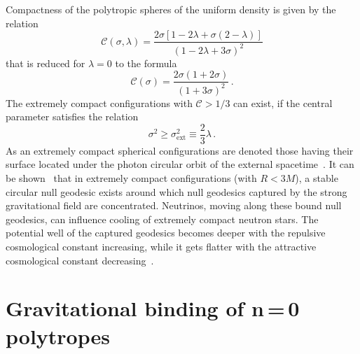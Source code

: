 Compactness of the polytropic spheres of the uniform density is given by the
relation
\begin{equation}
  \mathcal{C}(\sigma, \lambda)= \frac{2 \sigma [1- 2 \lambda + \sigma
    (2- \lambda)]}{(1- 2 \lambda + 3 \sigma)^{2}}         \label{Eq:grp-c1}
\end{equation}
that is reduced for $\lambda = 0$ to the formula
\begin{equation}
  \mathcal{C}(\sigma)
    = \frac{2 \sigma (1+ 2 \sigma)}{(1+ 3 \sigma)^{2}}\,. \label{Eq:grp-c2}
\end{equation}
The extremely compact configurations with $\mathcal{C} > 1/3$ can exist, if
the central parameter satisfies the relation
\begin{equation}
  \sigma^{2} \geq \sigma^{2}_{\mathrm{ext}} \equiv
    \frac{2}{3}\lambda\,.                                 \label{Eq:grp-c3}
\end{equation}
As an extremely compact spherical configurations are denoted those having
their surface located under the photon circular orbit of the external
spacetime~\cite{Stu:2008:0803.2530:SpSyStCoUniDens}. It can be
shown~\cite{Stu-etal:2001:PHYSR4:} that in extremely compact configurations
(with $R < 3M$), a stable circular null geodesic exists around which null
geodesics captured by the strong gravitational field are concentrated.
Neutrinos, moving along these bound null geodesics, can influence cooling of
extremely compact neutron stars.  The potential well of the captured geodesics
becomes deeper with the repulsive cosmological constant increasing, while it
gets flatter with the attractive cosmological constant
decreasing~\cite{Stu-etal:2012:GENRG2:NeutrinoTrap}.

\section[Gravitational binding of $n=0$ polytropes]%
{Gravitational binding of \mbox{n\,=\,0} polytropes}%
\label{Sec:UniGraB}

